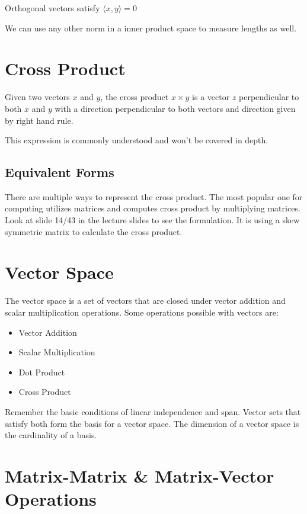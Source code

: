 Orthogonal vectors satisfy $\langle x, y \rangle = 0$

We can use any other norm in a inner product space to measure lengths as well.

\section{Cross Product}

Given two vectors $x$ and $y$, the cross product $x \times y$ is a vector $z$ perpendicular to both $x$ and $y$ with a direction perpendicular to both vectors and direction given by right hand rule. 

This expression is commonly understood and won't be covered in depth.

\subsection{Equivalent Forms}

There are multiple ways to represent the cross product. The most popular one for computing utilizes matrices and computes cross product by multiplying matrices. Look at slide 14/43 in the lecture slides to see the formulation. It is using a skew symmetric matrix to calculate the cross product.

\section{Vector Space}

The vector space is a set of vectors that are closed under vector addition and scalar multiplication operations. Some operations possible with vectors are:

\begin{itemize}
    \item Vector Addition
    \item Scalar Multiplication
    \item Dot Product
    \item Cross Product
\end{itemize}

Remember the basic conditions of linear independence and span. Vector sets that satisfy both form the basis for a vector space. The dimension of a vector space is the cardinality of a basis.

\section{Matrix-Matrix \& Matrix-Vector Operations}

